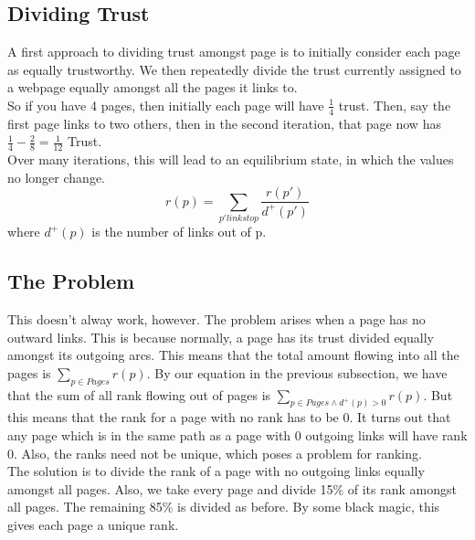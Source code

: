 \documentclass[12pt]{article}
\theoremstyle{definition}
\begin{document}
\subsection{Dividing Trust}
A first approach to dividing trust amongst page is to initially consider each page as equally trustworthy. We then repeatedly divide the trust currently assigned to a webpage equally amongst all the pages it links to. 
\\ \linebreak
So if you have 4 pages, then initially each page will have $\frac{1}{4}$ trust. Then, say the first page links to two others, then in the second iteration, that page now has  $\frac{1}{4} - \frac{2}{8} =  \frac{1}{12}$ Trust.
\\ \linebreak
Over many iterations, this will lead to an equilibrium state, in which the values no longer change. 
$$r(p) = \sum_{p'links to p} \frac{r(p')}{d^+(p')}$$
where $d^+(p)$ is the number of links out of p.

\subsection{The Problem}
This doesn't alway work, however. The problem arises when a page has no outward links. This is because normally, a page has its trust divided equally amongst its outgoing arcs. This means that the total amount flowing into all the pages is $\sum_{p\in Pages}r(p)$. By our equation in the previous subsection, we have that the sum of all rank flowing out of pages is $\sum_{p\in Pages \wedge d^+(p)>0}r(p)$. But this means that the rank for a page with no rank has to be 0. It turns out that any page which is in the same path as a page with 0 outgoing links will have rank 0. Also, the ranks need not be unique, which poses a problem for ranking.
\\ \linebreak
The solution is to divide the rank of a page with no outgoing links equally amongst all pages. Also, we take every page and divide 15\% of its rank amongst all pages. The remaining 85\% is divided as before. By some black magic, this gives each page a unique rank.
\\ \linebreak
\end{document}
